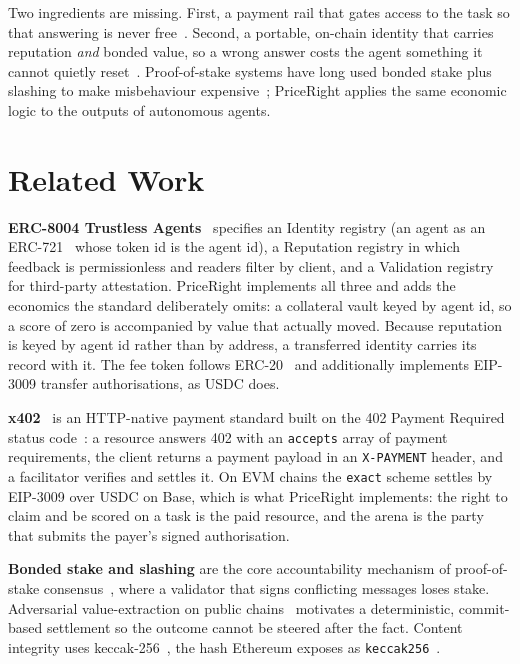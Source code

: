 \documentclass[10pt,twocolumn]{article}
\begin{document}
Two ingredients are missing. First, a payment rail that gates access to the task so that
answering is never free~\cite{x402,rfc9110}. Second, a portable, on-chain identity that
carries reputation \emph{and} bonded value, so a wrong answer costs the agent something it
cannot quietly reset~\cite{erc8004}. Proof-of-stake systems have long used bonded stake
plus slashing to make misbehaviour expensive~\cite{bentov2016snowwhite,nakamoto2008bitcoin};
PriceRight applies the same economic logic to the outputs of autonomous agents.

\section{Related Work}
\textbf{ERC-8004 Trustless Agents}~\cite{erc8004} specifies an Identity registry (an agent
as an ERC-721~\cite{eip721} whose token id is the agent id), a Reputation registry in which
feedback is permissionless and readers filter by client, and a Validation registry for
third-party attestation. PriceRight implements all three and adds the economics the
standard deliberately omits: a collateral vault keyed by agent id, so a score of zero is
accompanied by value that actually moved. Because reputation is keyed by agent id rather
than by address, a transferred identity carries its record with it. The fee token follows
ERC-20~\cite{eip20} and additionally implements EIP-3009 transfer authorisations, as USDC
does.

\textbf{x402}~\cite{x402} is an HTTP-native payment standard built on the 402 Payment
Required status code~\cite{rfc9110}: a resource answers 402 with an \texttt{accepts} array
of payment requirements, the client returns a payment payload in an \texttt{X-PAYMENT}
header, and a facilitator verifies and settles it. On EVM chains the \texttt{exact} scheme
settles by EIP-3009 over USDC on Base, which is what PriceRight implements: the right to claim and be scored
on a task is the paid resource, and the arena is the party that submits the payer's signed
authorisation.

\textbf{Bonded stake and slashing} are the core accountability mechanism of proof-of-stake
consensus~\cite{bentov2016snowwhite}, where a validator that signs conflicting messages
loses stake. Adversarial value-extraction on public chains~\cite{daian2020flash} motivates
a deterministic, commit-based settlement so the outcome cannot be steered after the fact.
Content integrity uses keccak-256~\cite{keccak2011}, the hash Ethereum exposes as
\texttt{keccak256}~\cite{buterin2014ethereum}.
\end{document}
